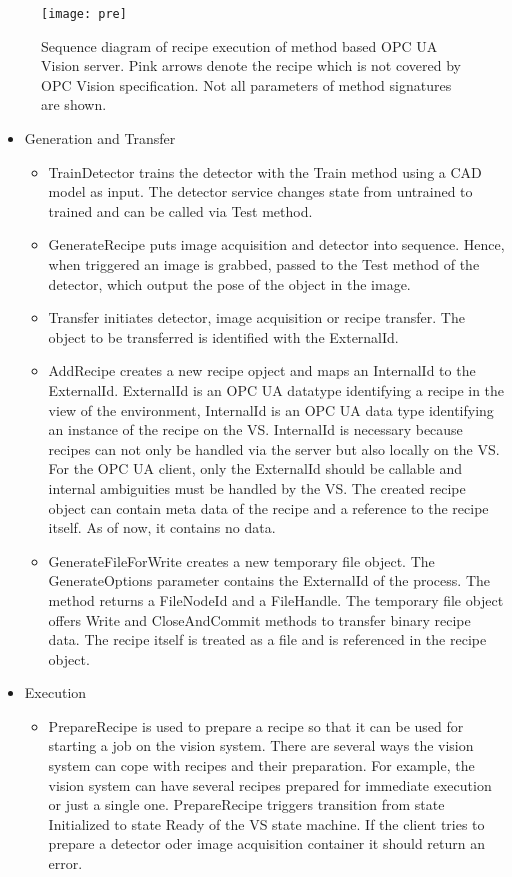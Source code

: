 \begin{figure}
    \centering
    \texttt{[image: pre]}
    \caption[Sequence diagram of recipe execution]{Sequence diagram of recipe execution of method based OPC UA Vision server. Pink arrows denote the recipe which is not covered by OPC Vision specification. Not all parameters of method signatures are shown.}
    \label{fig:runtimeviewexec}
\end{figure}

\begin{itemize}
    \item Generation and Transfer
    \begin{itemize}
        \item TrainDetector trains the detector with the Train method using a CAD model as input. The detector service changes state from untrained to trained and can be called via Test method.
        \item GenerateRecipe puts image acquisition and detector into sequence. Hence, when triggered an image is grabbed, passed to the Test method of the detector, which output the pose of the object in the image.
        \item Transfer initiates detector, image acquisition or recipe transfer. The object to be transferred is identified with the ExternalId.
        \item AddRecipe creates a new recipe opject and maps an InternalId to the ExternalId. ExternalId is an OPC UA datatype identifying a recipe in the view of the environment, InternalId is an OPC UA data type identifying an instance of the recipe on the VS.  InternalId is necessary because recipes can not only be handled via the server but also locally on the VS. For the OPC UA client, only the ExternalId should be callable and internal ambiguities must be handled by the VS. The created recipe object can contain meta data of the recipe and a reference to the recipe itself. As of now, it contains no data.
    	\item GenerateFileForWrite creates a new temporary file object. The GenerateOptions parameter contains the ExternalId of the process. The method returns a FileNodeId and a FileHandle. The temporary file object offers Write and CloseAndCommit methods to transfer binary recipe data. The recipe itself is treated as a file and is referenced in the recipe object.
    \end{itemize}
    \item Execution
    \begin{itemize}
    	\item PrepareRecipe is used to prepare a recipe so that it can be used for starting a job on the vision system. There are several ways the vision system can cope with recipes and their preparation. For example, the vision system can have several recipes prepared for immediate execution or just a single one. PrepareRecipe triggers transition from state Initialized to state Ready of the VS state machine. If the client tries to prepare a detector oder image acquisition container it should return an error.

\end{itemize}
\end{itemize}
